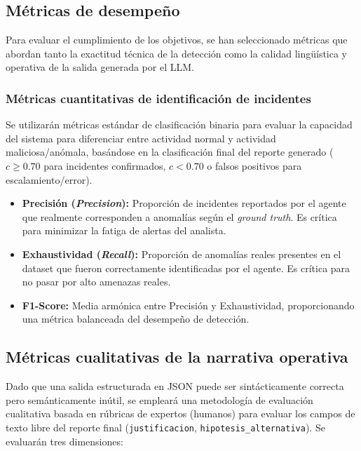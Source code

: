 \subsection{Métricas de desempeño}

Para evaluar el cumplimiento de los objetivos, se han seleccionado métricas que abordan tanto la exactitud técnica de la detección como la calidad lingüística y operativa de la salida generada por el LLM.

\subsubsection{Métricas cuantitativas de identificación de incidentes}

Se utilizarán métricas estándar de clasificación binaria para evaluar la capacidad del sistema para diferenciar entre actividad normal y actividad maliciosa/anómala, basándose en la clasificación final del reporte generado ($c \geq 0.70$ para incidentes confirmados, $c < 0.70$ o falsos positivos para escalamiento/error).

\begin{itemize}
    \item \textbf{Precisión (\textit{Precision}):} Proporción de incidentes reportados por el agente que realmente corresponden a anomalías según el \textit{ground truth}. Es crítica para minimizar la fatiga de alertas del analista.
    \item \textbf{Exhaustividad (\textit{Recall}):} Proporción de anomalías reales presentes en el dataset que fueron correctamente identificadas por el agente. Es crítica para no pasar por alto amenazas reales.
    \item \textbf{F1-Score:} Media armónica entre Precisión y Exhaustividad, proporcionando una métrica balanceada del desempeño de detección.
\end{itemize}

\subsection{Métricas cualitativas de la narrativa operativa}

Dado que una salida estructurada en JSON puede ser sintácticamente correcta pero semánticamente inútil, se empleará una metodología de evaluación cualitativa basada en rúbricas de expertos (humanos) para evaluar los campos de texto libre del reporte final (\texttt{justificacion}, \texttt{hipotesis\_alternativa}). Se evaluarán tres dimensiones:

